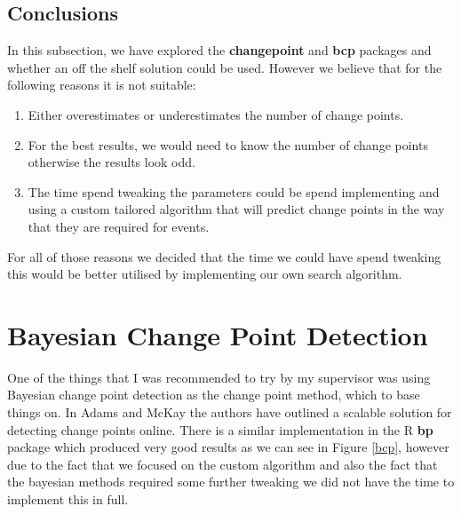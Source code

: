 \documentclass[minf,twoside,singlespacing,parskip,notimes,deptreport]{infthesis} %
\begin{document}
\newpage
\subsection{Conclusions}

In this subsection, we have explored the \textbf{changepoint} and \textbf{bcp} packages and whether an off the shelf solution could be used. However we believe that for the following reasons it is not suitable:
\begin{enumerate}
\item Either overestimates or underestimates the number of change points. 
\item For the best results, we would need to know the number of change points otherwise the results look odd.
\item The time spend tweaking the parameters could be spend implementing and using a custom tailored algorithm that will predict change points in the way that they are required for events. 
\end{enumerate}

For all of those reasons we decided that the time we could have spend tweaking this would be better utilised by implementing our own search algorithm. 


\section{Bayesian Change Point Detection}

One of the things that I was recommended to try by my supervisor was using Bayesian change point detection as the change point method, which to base things on. In Adams and McKay\cite{adams2007bayesian} the authors have outlined a scalable solution for detecting change points online. There is a similar implementation in the R \textbf{bp} package which produced very good results as we can see in Figure \ref{bcp}, however due to the fact that we focused on the custom algorithm and also the fact that the bayesian methods required some further tweaking we did not have the time to implement this in full. 
\end{document}
